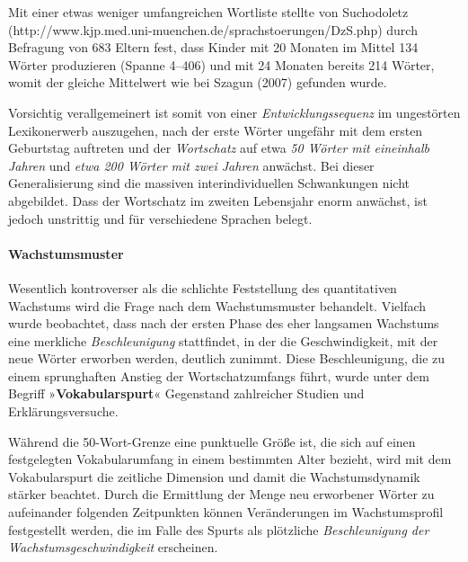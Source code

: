 \documentclass[
  letterpaper,
]{scrbook}
\let\oldparagraph\paragraph
\renewcommand{\paragraph}[1]{\oldparagraph{#1}\mbox{}}
\begin{document}
\begin{tcolorbox}[enhanced jigsaw, breakable, colframe=quarto-callout-note-color-frame, bottomrule=.15mm, left=2mm, opacityback=0, colback=white, rightrule=.15mm, toprule=.15mm, leftrule=.75mm, arc=.35mm]
\begin{minipage}[t]{5.5mm}
\textcolor{quarto-callout-note-color}{\faInfo}
\end{minipage}%
\begin{minipage}[t]{\textwidth - 5.5mm}

Mit einer etwas weniger umfangreichen Wortliste stellte von Suchodoletz
(http://www.kjp.med.uni-muenchen.de/sprachstoerungen/DzS.php) durch
Befragung von 683 Eltern fest, dass Kinder mit 20 Monaten im Mittel 134
Wörter produzieren (Spanne 4--406) und mit 24 Monaten bereits 214
Wörter, womit der gleiche Mittelwert wie bei Szagun (2007) gefunden
wurde.

\end{minipage}%
\end{tcolorbox}

Vorsichtig verallgemeinert ist somit von einer
\emph{Entwicklungssequenz} im ungestörten Lexikonerwerb auszugehen, nach
der erste Wörter ungefähr mit dem ersten Geburtstag auftreten und der
\emph{Wortschatz} auf etwa \emph{50 Wörter mit} \emph{eineinhalb Jahren}
und \emph{etwa 200 Wörter mit zwei Jahren} anwächst. Bei dieser
Generalisierung sind die massiven interindividuellen Schwankungen nicht
abgebildet. Dass der Wortschatz im zweiten Lebensjahr enorm anwächst,
ist jedoch unstrittig und für verschiedene Sprachen belegt.

\hypertarget{wachstumsmuster}{%
\paragraph{Wachstumsmuster}\label{wachstumsmuster}}

Wesentlich kontroverser als die schlichte Feststellung des quantitativen
Wachstums wird die Frage nach dem Wachstumsmuster behandelt. Vielfach
wurde beobachtet, dass nach der ersten Phase des eher langsamen
Wachstums eine merkliche \emph{Beschleunigung} stattfindet, in der die
Geschwindigkeit, mit der neue Wörter erworben werden, deutlich zunimmt.
Diese Beschleunigung, die zu einem sprunghaften Anstieg der
Wortschatzumfangs führt, wurde unter dem Begriff
»\textbf{Vokabularspurt}« Gegenstand zahlreicher Studien und
Erklärungsversuche.

Während die 50-Wort-Grenze eine punktuelle Größe ist, die sich auf einen
festgelegten Vokabularumfang in einem bestimmten Alter bezieht, wird mit
dem Vokabularspurt die zeitliche Dimension und damit die
Wachstumsdynamik stärker beachtet. Durch die Ermittlung der Menge neu
erworbener Wörter zu aufeinander folgenden Zeitpunkten können
Veränderungen im Wachstumsprofil festgestellt werden, die im Falle des
Spurts als plötzliche \emph{Beschleunigung der Wachstumsgeschwindigkeit}
erscheinen.
\end{document}
